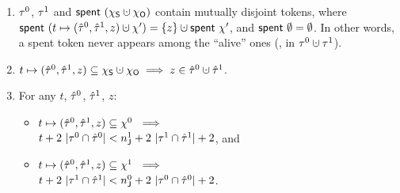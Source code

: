 \begin{enumerate}[label=(\roman*)]
\item\label{cn:ti}  
%
  $\tau^0$, $\tau^1$ and $\Tomb~(\hists \hunion \histo)$ contain
  mutually disjoint tokens, where $\Tomb~(t \mapsto (\tknh^0,\tknh^1,
  z) \hunion \hist') = \{z\} \hunion \Tomb~\hist'$, and
  $\mathsf{spent}~\emptyset = \emptyset$. In other words, a spent token
  never appears among the ``alive'' ones (\ie, in $\tkn^0 \hunion
  \tkn^1$).


\item\label{cn:ti1}
%
  $t \mapsto (\tknh^0, \tknh^1, z) \subseteq \hists \hunion \histo
  \implies z \in \tknh^0 \hunion \tknh^1$. \\[-7pt]

\item\label{cn:ai} 
%
For any $t$, $\hat{\tau}^0$, $\hat{\tau}^1$, $z$: \\[-7pt]
% 
  \begin{itemize}
  \item   $t \mapsto (\hat{\tau}^0, \hat{\tau}^1, z) \subseteq \chi^0 ~\implies$\\[2pt]
    $t + 2\ |\tau^0 \cap \hat{\tau}^0| < n^1_{\mathsf{J}} + 2\ |\tau^1 \cap
    \hat{\tau}^1| + 2$, and \\[-7pt]
  \item
    $t \mapsto (\hat{\tau}^0, \hat{\tau}^1, z) \subseteq \chi^1 ~\implies$\\[2pt]
    $t + 2\ |\tau^1 \cap \hat{\tau}^1| < n^0_{\mathsf{J}} + 2\ |\tau^0 \cap
    \hat{\tau}^0| + 2$.
  \end{itemize}
%
\end{enumerate}
\vspace{2pt}

